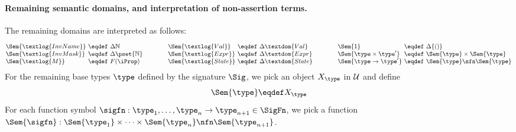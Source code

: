 \paragraph{Remaining semantic domains, and interpretation of non-assertion terms.}

The remaining domains are interpreted as follows:
\[
\begin{array}[t]{@{}l@{\ }c@{\ }l@{}}
\Sem{\textlog{InvName}} &\eqdef& \Delta \mathbb{N}  \\
\Sem{\textlog{InvMask}} &\eqdef& \Delta \pset{\mathbb{N}} \\
\Sem{\textlog{M}} &\eqdef& F(\iProp)
\end{array}
\qquad\qquad
\begin{array}[t]{@{}l@{\ }c@{\ }l@{}}
\Sem{\textlog{Val}} &\eqdef& \Delta \textdom{Val} \\
\Sem{\textlog{Expr}} &\eqdef& \Delta \textdom{Expr} \\
\Sem{\textlog{State}} &\eqdef& \Delta \textdom{State} \\
\end{array}
\qquad\qquad
\begin{array}[t]{@{}l@{\ }c@{\ }l@{}}
\Sem{1} &\eqdef& \Delta \{ () \} \\
\Sem{\type \times \type'} &\eqdef& \Sem{\type} \times \Sem{\type} \\
\Sem{\type \to \type'} &\eqdef& \Sem{\type} \nfn \Sem{\type} \\
\end{array}
\]
For the remaining base types $\type$ defined by the signature $\Sig$, we pick an object $X_\type$ in $\cal U$ and define
\[
\Sem{\type} \eqdef X_\type
\]
For each function symbol $\sigfn : \type_1, \dots, \type_n \to \type_{n+1} \in \SigFn$, we pick a function $\Sem{\sigfn} : \Sem{\type_1} \times \dots \times \Sem{\type_n} \nfn \Sem{\type_{n+1}}$.

